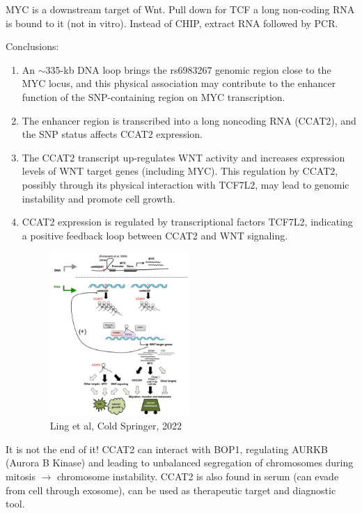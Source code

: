 MYC is a downstream target of Wnt. Pull down for TCF a long non-coding RNA is bound to it (not in vitro). Instead of CHIP, extract RNA followed by PCR.

Conclusions:

\begin{enumerate}
\def\labelenumi{\arabic{enumi}.}
\item
  An $\sim$335-kb DNA loop brings the rs6983267 genomic region close to the MYC locus, and this physical association may contribute to the enhancer function of the SNP-containing region on MYC transcription.
\item
  The enhancer region is transcribed into a long noncoding RNA (CCAT2), and the SNP status affects CCAT2 expression.
\item
  The CCAT2 transcript up-regulates WNT activity and increases expression levels of WNT target genes (including MYC). This regulation by CCAT2, possibly through its physical interaction with TCF7L2, may lead to genomic instability and promote cell growth.
\item
  CCAT2 expression is regulated by transcriptional factors TCF7L2, indicating a positive feedback loop between CCAT2 and WNT signaling.

  \begin{figure}
  \centering
  \includegraphics[width=0.5\textwidth]{../_resources/Screenshot_2022-10-14_at_11-20-37.png}
  \caption{Ling et al, Cold Springer, 2022}
  \end{figure}
\end{enumerate}

It is not the end of it! CCAT2 can interact with BOP1, regulating AURKB (Aurora B Kinase) and leading to unbalanced segregation of chromosomes during mitosis $\rightarrow$ chromosome instability. CCAT2 is also found in serum (can evade from cell through exosome), can be used as therapeutic target and diagnostic tool.
